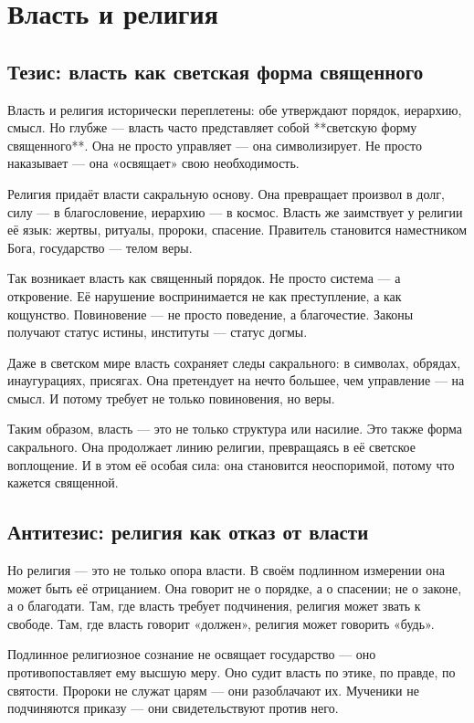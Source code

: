 \chapter{Власть и религия}

\section{Тезис: власть как светская форма священного}

Власть и религия исторически переплетены: обе утверждают порядок, иерархию, смысл. Но глубже — власть часто представляет собой **светскую форму священного**. Она не просто управляет — она символизирует. Не просто наказывает — она «освящает» свою необходимость.

Религия придаёт власти сакральную основу. Она превращает произвол в долг, силу — в благословение, иерархию — в космос. Власть же заимствует у религии её язык: жертвы, ритуалы, пророки, спасение. Правитель становится наместником Бога, государство — телом веры.

Так возникает власть как священный порядок. Не просто система — а откровение. Её нарушение воспринимается не как преступление, а как кощунство. Повиновение — не просто поведение, а благочестие. Законы получают статус истины, институты — статус догмы.

Даже в светском мире власть сохраняет следы сакрального: в символах, обрядах, инаугурациях, присягах. Она претендует на нечто большее, чем управление — на смысл. И потому требует не только повиновения, но веры.

Таким образом, власть — это не только структура или насилие. Это также форма сакрального. Она продолжает линию религии, превращаясь в её светское воплощение. И в этом её особая сила: она становится неоспоримой, потому что кажется священной.

\section{Антитезис: религия как отказ от власти}

Но религия — это не только опора власти. В своём подлинном измерении она может быть её отрицанием. Она говорит не о порядке, а о спасении; не о законе, а о благодати. Там, где власть требует подчинения, религия может звать к свободе. Там, где власть говорит «должен», религия может говорить «будь».

Подлинное религиозное сознание не освящает государство — оно противопоставляет ему высшую меру. Оно судит власть по этике, по правде, по святости. Пророки не служат царям — они разоблачают их. Мученики не подчиняются приказу — они свидетельствуют против него.

